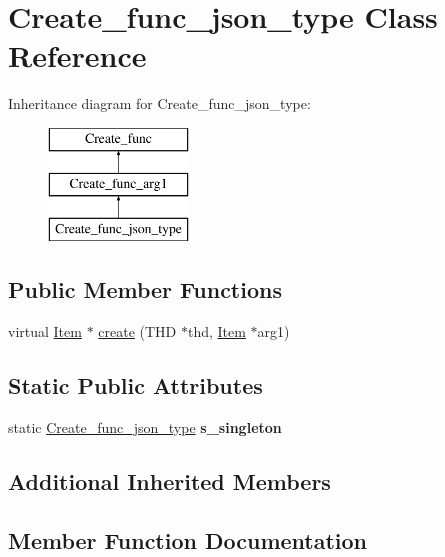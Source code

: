\hypertarget{classCreate__func__json__type}{}\section{Create\+\_\+func\+\_\+json\+\_\+type Class Reference}
\label{classCreate__func__json__type}
Inheritance diagram for Create\+\_\+func\+\_\+json\+\_\+type\+:\begin{figure}[H]
\begin{center}
\leavevmode
\includegraphics[height=3.000000cm]{classCreate__func__json__type}
\end{center}
\end{figure}
\subsection*{Public Member Functions}
\begin{DoxyCompactItemize}
\item 
virtual \mbox{\hyperlink{classItem}{Item}} $\ast$ \mbox{\hyperlink{classCreate__func__json__type_aacb7f4e6f61faeabbe2837e05f504b23}{create}} (T\+HD $\ast$thd, \mbox{\hyperlink{classItem}{Item}} $\ast$arg1)
\end{DoxyCompactItemize}
\subsection*{Static Public Attributes}
\begin{DoxyCompactItemize}
\item 
\mbox{\label{classCreate__func__json__type_a2418255008a8bbd1a40013d21f499221}} 
static \mbox{\hyperlink{classCreate__func__json__type}{Create\+\_\+func\+\_\+json\+\_\+type}} {\bfseries s\+\_\+singleton}
\end{DoxyCompactItemize}
\subsection*{Additional Inherited Members}


\subsection{Member Function Documentation}
\mbox{\label{classCreate__func__json__type_aacb7f4e6f61faeabbe2837e05f504b23}} 
